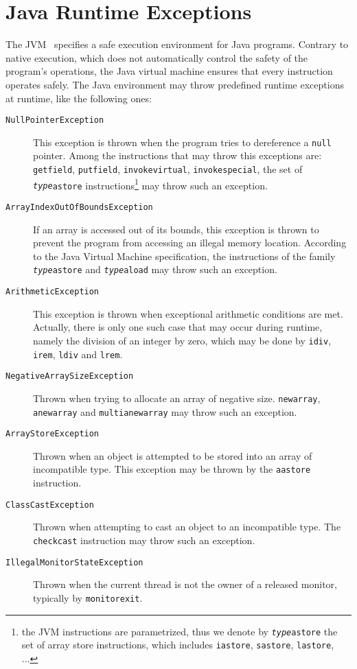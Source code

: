 

\section{Java Runtime Exceptions}
\label{sec:runtimeexceptions}
The JVM~\cite{Lindholm2000} specifies a safe execution environment for Java programs. Contrary to native execution, which does not automatically control the safety of the program's operations, the Java virtual machine ensures that every instruction operates safely. The Java environment may throw predefined runtime exceptions at runtime, like the following ones:

\begin{description}
\item[\texttt{NullPointerException}]
This exception is thrown when the program tries to dereference a \texttt{null} pointer. Among the instructions
that may throw this exceptions are: \texttt{getfield}, \texttt{putfield}, \texttt{invokevirtual}, \texttt{invokespecial}, the set of  \texttt{\emph{type}astore} instructions\footnote{the JVM instructions are parametrized, thus we denote by \texttt{\emph{type}astore} the set of array store instructions, which includes \texttt{iastore}, \texttt{sastore}, \texttt{lastore}, ...} may throw such an exception.
\item[\texttt{ArrayIndexOutOfBoundsException}] If an array is accessed out of its bounds, this exception is thrown to prevent the program from accessing an illegal memory location. According to the Java Virtual Machine specification, the instructions of the family \texttt{\emph{type}astore} and \texttt{\emph{type}aload} may throw such an exception.
\item[\texttt{ArithmeticException}] This exception is thrown when exceptional arithmetic conditions are met. Actually, there is only one such case that may occur during runtime, namely the division of an integer by zero, which may be done by \texttt{idiv}, \texttt{irem}, \texttt{ldiv} and \texttt{lrem}.
\item[\texttt{NegativeArraySizeException}] Thrown when trying to allocate an array of negative size. \texttt{newarray}, \texttt{anewarray} and \texttt{multianewarray} may throw such an exception.
\item[\texttt{ArrayStoreException}] Thrown when an object is attempted to be stored into an array of incompatible type. This exception may be thrown by the \texttt{aastore} instruction.
\item[\texttt{ClassCastException}] Thrown when attempting to cast an object to an incompatible type. The \texttt{checkcast} instruction may throw such an exception.
\item[\texttt{IllegalMonitorStateException}] Thrown when the current thread is not the owner of a released monitor, typically by \texttt{monitorexit}.

\end{description}

